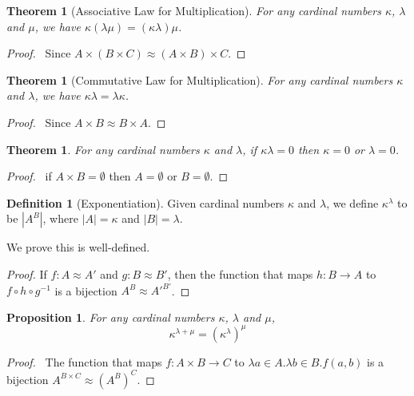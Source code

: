 \documentclass{book}
\let\qed\relax
\newtheorem{prop}[ax]{Proposition}
\newtheorem{thm}[ax]{Theorem}
\theoremstyle{definition}
\newtheorem{df}[ax]{Definition}
\begin{document}
\begin{thm}[Associative Law for Multiplication]
For any cardinal numbers $\kappa$, $\lambda$ and $\mu$, we have $\kappa (\lambda \mu) = (\kappa \lambda) \mu$.
\end{thm}

\begin{proof}
\pf\ Since $A \times (B \times C) \approx (A \times B) \times C$. \qed
\end{proof}

\begin{thm}[Commutative Law for Multiplication]
For any cardinal numbers $\kappa$ and $\lambda$, we have $\kappa \lambda = \lambda \kappa$.
\end{thm}

\begin{proof}
\pf\ Since $A \times B \approx B \times A$. \qed
\end{proof}

\begin{thm}
For any cardinal numbers $\kappa$ and $\lambda$, if $\kappa \lambda = 0$ then $\kappa = 0$ or $\lambda = 0$.
\end{thm}

\begin{proof}
\pf\ if $A \times B = \emptyset$ then $A = \emptyset$ or $B = \emptyset$. \qed
\end{proof}

\begin{df}[Exponentiation]
Given cardinal numbers $\kappa$ and $\lambda$, we define $\kappa^\lambda$ to be $|A^B|$, where $|A| = \kappa$ and $|B| = \lambda$.

We prove this is well-defined.
\end{df}

\begin{proof}
\pf
If $f : A \approx A'$ and $g : B \approx B'$, then the function that maps $h : B \rightarrow A$ to $f \circ h \circ g^{-1}$ is a bijection $A^B \approx A'^{B'}$. \qed
\end{proof}

\begin{prop}
For any cardinal numbers $\kappa$, $\lambda$ and $\mu$,
\[ \kappa^{\lambda + \mu} = (\kappa^{\lambda})^\mu \]
\end{prop}

\begin{proof}
\pf\ The function that maps $f : A \times B \rightarrow C$ to $\lambda a \in A. \lambda b \in B. f(a,b)$ is a bijection $A^{B \times C} \approx (A^B)^C$. \qed
\end{proof}
\end{document}
